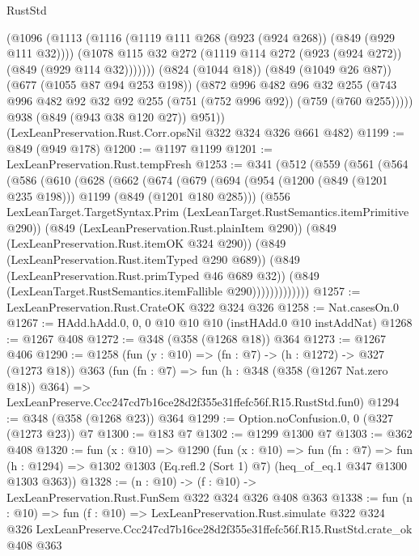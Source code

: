 \begin{lexlean}{RustStd}
\begin{coremodule}
            (@1096
              (@1113
                (@1116 (@1119 @111 @268 (@923 (@924 @268)) (@849 (@929 @111 @32))))
                (@1078 @115 @32 @272 (@1119 @114 @272 (@923 (@924 @272)) (@849 (@929 @114 @32)))))))
          (@824 (@1044 @18))
          (@849 (@1049 @26 @87))
          (@677 (@1055 @87 @94 @253 @198))
          (@872
            @996
            @482
            @96
            @32
            @255
            (@743 @996 @482 @92 @32 @92 @255 (@751 (@752 @996 @92)) (@759 (@760 @255)))))
        @938
        (@849 (@943 @38 @120 @27))
        @951))
    (LexLeanPreservation.Rust.Corr.opsNil @322 @324 @326 @661 @482)
@1199 := @849 (@949 @178)
@1200 := @1197 @1199
@1201 := LexLeanPreservation.Rust.tempFresh
@1253 := @341
    (@512
      (@559
        (@561
          (@564
            (@586
              (@610
                (@628
                  (@662
                    (@674
                      (@679
                        (@694
                          (@954 (@1200 (@849 (@1201 @235 @198))) @1199 (@849 (@1201 @180 @285)))
                          (@556
                            LexLeanTarget.TargetSyntax.Prim
                            (LexLeanTarget.RustSemantics.itemPrimitive @290))
                          (@849 (LexLeanPreservation.Rust.plainItem @290))
                          (@849 (LexLeanPreservation.Rust.itemOK @324 @290))
                          (@849 (LexLeanPreservation.Rust.itemTyped @290 @689))
                          (@849 (LexLeanPreservation.Rust.primTyped @46 @689 @32))
                          (@849 (LexLeanTarget.RustSemantics.itemFallible @290)))))))))))))
@1257 := LexLeanPreservation.Rust.CrateOK @322 @324 @326
@1258 := Nat.casesOn.{0}
@1267 := HAdd.hAdd.{0, 0, 0} @10 @10 @10 (instHAdd.{0} @10 instAddNat)
@1268 := @1267 @408
@1272 := @348 (@358 (@1268 @18)) @364
@1273 := @1267 @406
@1290 := @1258
    (fun (y : @10) => (fn : @7) -> (h : @1272) -> @327 (@1273 @18))
    @363
    (fun (fn : @7) =>
    fun (h : @348 (@358 (@1267 Nat.zero @18)) @364) =>
    LexLeanPreserve.Ccc247cd7b16ce28d2f355e31ffefc56f.R15.RustStd.fun0)
@1294 := @348 (@358 (@1268 @23)) @364
@1299 := Option.noConfusion.{0, 0} (@327 (@1273 @23)) @7
@1300 := @183 @7
@1302 := @1299 @1300 @7
@1303 := @362 @408
@1320 := fun (x : @10) =>
  @1290
    (fun (x : @10) =>
    fun (fn : @7) =>
    fun (h : @1294) => @1302 @1303 (Eq.refl.{2} (Sort 1) @7) (heq_of_eq.{1} @347 @1300 @1303 @363))
@1328 := (n : @10) -> (f : @10) -> LexLeanPreservation.Rust.FunSem @322 @324 @326 @408 @363
@1338 := fun (n : @10) =>
  fun (f : @10) =>
  LexLeanPreservation.Rust.simulate
    @322
    @324
    @326
    LexLeanPreserve.Ccc247cd7b16ce28d2f355e31ffefc56f.R15.RustStd.crate_ok
    @408
    @363
\end{coremodule}
\end{lexlean}
